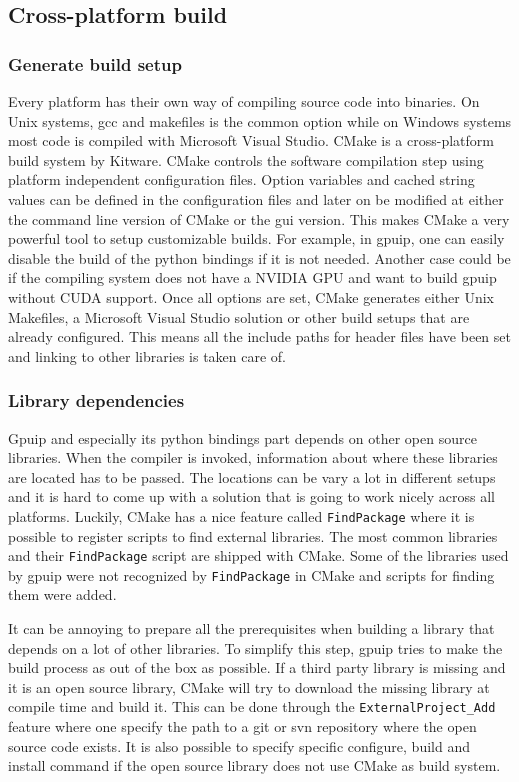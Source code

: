 \subsection{Cross-platform build}
\subsubsection{Generate build setup}
Every platform has their own way of compiling source code into binaries. On Unix systems, gcc and makefiles is the common option while on Windows systems most code is compiled with Microsoft Visual Studio. CMake is a cross-platform build system by Kitware\cite{cmake}. CMake controls the software compilation step using platform independent configuration files. Option variables and cached string values can be defined in the configuration files and later on be modified at either the command line version of CMake or the gui version. This makes CMake a very powerful tool to setup customizable builds. For example, in gpuip, one can easily disable the build of the python bindings if it is not needed. Another case could be if the compiling system does not have a NVIDIA GPU and want to build gpuip without CUDA support. Once all options are set, CMake generates either Unix Makefiles, a Microsoft Visual Studio solution or other build setups that are already configured. This means all the include paths for header files have been set and linking to other libraries is taken care of.

\subsubsection{Library dependencies}
Gpuip and especially its python bindings part depends on other open source libraries. When the compiler is invoked, information about where these libraries are located has to be passed. The locations can be vary a lot in different setups and it is hard to come up with a solution that is going to work nicely across all platforms. Luckily, CMake has a nice feature called {\tt FindPackage} where it is possible to register scripts to find external libraries. The most common libraries and their {\tt FindPackage} script are shipped with CMake. Some of the libraries used by gpuip were not recognized by {\tt FindPackage} in CMake and scripts for finding them were added.
\newline

It can be annoying to prepare all the prerequisites when building a library that depends on a lot of other libraries. To simplify this step, gpuip tries to make the build process as out of the box as possible. If a third party library is missing and it is an open source library, CMake will try to download the missing library at compile time and build it. This can be done through the {\tt ExternalProject\_Add} feature where one specify the path to a git or svn repository where the open source code exists. It is also possible to specify specific configure, build and install command if the open source library does not use CMake as build system.

